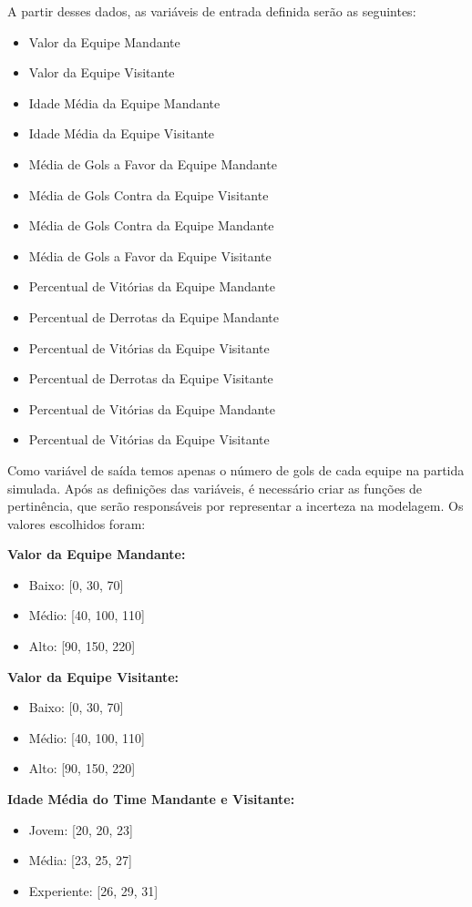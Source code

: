 \documentclass[conference]{IEEEtran}
\begin{document}
\indent A partir desses dados, as variáveis de entrada definida serão as seguintes:
\begin{itemize}
    \item Valor da Equipe Mandante
    \item Valor da Equipe Visitante
    \item Idade Média da Equipe Mandante
    \item Idade Média da Equipe Visitante
    \item Média de Gols a Favor da Equipe Mandante
    \item Média de Gols Contra da Equipe Visitante
    \item Média de Gols Contra da Equipe Mandante
    \item Média de Gols a Favor da Equipe Visitante
    \item Percentual de Vitórias da Equipe Mandante
    \item Percentual de Derrotas da Equipe Mandante
    \item Percentual de Vitórias da Equipe Visitante
    \item Percentual de Derrotas da Equipe Visitante
    \item Percentual de Vitórias da Equipe Mandante
    \item Percentual de Vitórias da Equipe Visitante
\end{itemize}
Como variável de saída temos apenas o número de gols de cada equipe na partida simulada.
\indent Após as definições das variáveis, é necessário criar as funções de 
pertinência, que serão responsáveis por representar a incerteza na modelagem. Os
valores escolhidos foram:

\textbf{Valor da Equipe Mandante:}
\begin{itemize}
    \item Baixo: [0, 30, 70]
    \item Médio: [40, 100, 110]
    \item Alto: [90, 150, 220]
\end{itemize}

\textbf{Valor da Equipe Visitante:}
\begin{itemize}
    \item Baixo: [0, 30, 70]
    \item Médio: [40, 100, 110]
    \item Alto: [90, 150, 220]
\end{itemize}

\textbf{Idade Média do Time Mandante e Visitante:}
\begin{itemize}
    \item Jovem: [20, 20, 23]
    \item Média: [23, 25, 27]
    \item Experiente: [26, 29, 31]
\end{itemize}
\end{document}
